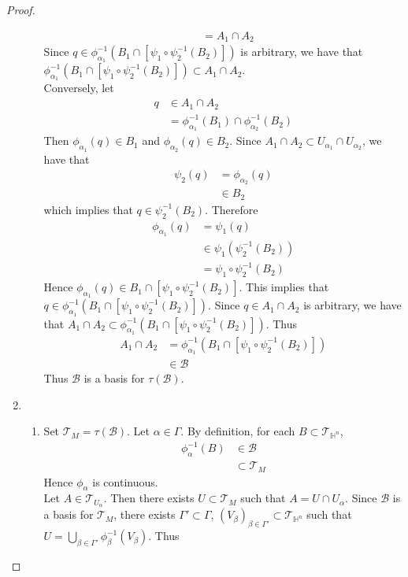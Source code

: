 \documentclass{book}
\theoremstyle{definition}
\newcommand{\al}{\alpha}
\newcommand{\be}{\beta}
\newcommand{\Gam}{\Gamma}
\renewcommand{\H}{\mathbb{H}}
\newcommand{\MB}{\mathcal{B}}
\newcommand{\MT}{\mathcal{T}}
\DeclareMathOperator*{\0}{\mbf{0}}
\DeclareMathOperator*{\1}{\mbf{1}}
\begin{document}
\begin{proof}
\begin{enumerate}
\begin{itemize}
\begin{align*}
					& = A_1 \cap A_2
				\end{align*}
				Since $q \in \phi_{\al_1}^{-1}(B_1 \cap [\psi_1 \circ \psi_2^{-1}(B_2)])$ is arbitrary, we have that $\phi_{\al_1}^{-1}(B_1 \cap [\psi_1 \circ \psi_2^{-1}(B_2)]) \subset A_1 \cap A_2$. \\
				Conversely, let  
				\begin{align*}
					q 
					& \in A_1 \cap A_2 \\ 
					& = \phi_{\al_1}^{-1}(B_1) \cap \phi_{\al_2}^{-1}(B_2)
				\end{align*}
				Then $\phi_{\al_1}(q) \in B_1$ and $\phi_{\al_2}(q) \in B_2$. Since $A_1 \cap A_2 \subset U_{\al_1} \cap U_{\al_2}$, we have that 
				\begin{align*}
					\psi_2(q)
					& = \phi_{\al_2}(q) \\
					& \in B_2
				\end{align*}
				which implies that $q \in \psi_2^{-1}(B_2)$. Therefore 
				\begin{align*}
					\phi_{\al_1}(q)
					& = \psi_1(q) \\
					& \in \psi_1 ( \psi_2^{-1}(B_2)) \\
					& =  \psi_1 \circ \psi_2^{-1}(B_2) 
				\end{align*}
				Hence $\phi_{\al_1}(q) \in B_1 \cap [\psi_1 \circ \psi_2^{-1}(B_2)]$. This implies that $q \in \phi_{\al_1}^{-1}( B_1 \cap [\psi_1 \circ \psi_2^{-1}(B_2)])$. Since $q \in A_1 \cap A_2$ is arbitrary, we have that $A_1 \cap A_2 \subset \phi_{\al_1}^{-1}( B_1 \cap [\psi_1 \circ \psi_2^{-1}(B_2)])$. Thus 
				\begin{align*}
					A_1 \cap A_2 
					& = \phi_{\al_1}^{-1}( B_1 \cap [\psi_1 \circ \psi_2^{-1}(B_2)]) \\
					& \in \MB
				\end{align*}
				Thus $\MB$ is a basis for $\tau(\MB)$.
			\end{itemize}
			\item 
			\begin{enumerate}
				\item Set $\MT_{M} = \tau(\MB)$. Let $\al \in \Gam$. By definition, for each $B \subset \MT_{\H^n}$, 
				\begin{align*}
					\phi_{\al}^{-1}(B) 
					& \in \MB \\
					& \subset \MT_M
				\end{align*}
				Hence $\phi_{\al}$ is continuous. \\
				Let $A \in \MT_{U_{\al}}$. Then there exists $U \subset \MT_M$ such that $A = U \cap U_{\al}$. Since $\MB$ is a basis for $\MT_M$, there exists $\Gam' \subset \Gam$, $(V_{\be})_{\be \in \Gam'} \subset \MT_{\H^n}$ such that $U = \bigcup_{ \be \in \Gam'} \phi_{\be}^{-1}(V_{\be})$. Thus 

\end{enumerate}
\end{enumerate}
\end{proof}
\end{document}
